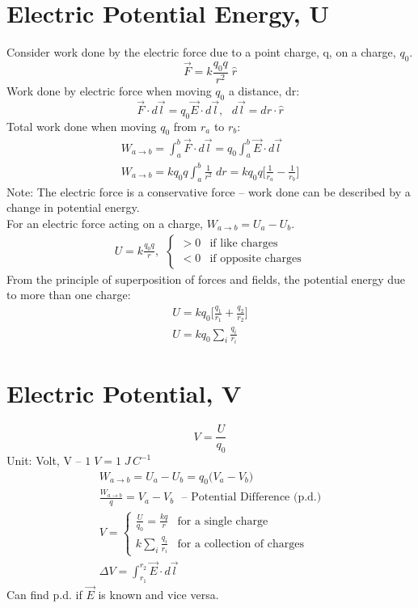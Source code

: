 \documentclass[a4paper, 11pt, fleqn, normalem]{report}
\begin{document}
\section{Electric Potential Energy, U}
Consider work done by the electric force due to a point charge, q, on a charge, $q_{0}$.
\begin{equation*}
    \vec{F} = k \frac{q_{0} q}{r^{2}} \; \hat{r}
\end{equation*}
Work done by electric force when moving $q_{0}$ a distance, dr:
\begin{equation*}
    \vec{F} \cdot d\vec{l} = q_{0}\vec{E} \cdot d\vec{l}, ~~~ d\vec{l} = dr \cdot \hat{r}
\end{equation*}
Total work done when moving $q_{0}$ from $r_{a}$ to $r_{b}$:
\begin{gather*}
    W_{a \to b} = \int_{a}^{b} \vec{F} \cdot d\vec{l} = q_{0} \int_{a}^{b} \vec{E} \cdot d\vec{l} \\
    W_{a \to b} = k q_{0} q \int_{a}^{b} \frac{1}{r^{2}} \; dr = k q_{0} q \Big[\frac{1}{r_{a}} - \frac{1}{r_{b}} \Big]
\end{gather*}
Note: The electric force is a conservative force -- work done can be described by a change in potential energy. \\
For an electric force acting on a charge, $W_{a \to b} = U_{a} - U_{b}$.
\begin{gather*}
    U = k \frac{q_{0} q}{r}, ~~
    \begin{cases}
        > 0 & \text{if like charges} \\
        < 0 & \text{if opposite charges}
    \end{cases}
\end{gather*}
From the principle of superposition of forces and fields, the potential energy due to more than one charge:
\begin{gather*}
    U = kq_{0}\Big[\frac{q_{1}}{r_{1}} + \frac{q_{2}}{r_{2}} \Big]\\
    U = kq_{0} \sum_{i} \frac{q_{i}}{r_{i}}
\end{gather*}

\section{Electric Potential, V}
\begin{equation*}
    V = \frac{U}{q_{0}}
\end{equation*}
Unit: Volt, V -- $1\;V = 1\;J\,C^{-1}$
\begin{gather*}
    W_{a \to b} = U_{a} - U_{b} = q_{0} \big(V_{a} - V_{b}\big) \\
    \frac{W_{a \to b}}{q} = V_{a} - V_{b} ~~~ \text{-- Potential Difference (p.d.)} \\
    V =
    \begin{cases}
        \frac{U}{q_{0}} = \frac{kq}{r} & \text{for a single charge} \\
        k \sum_{i} \frac{q_{i}}{r_{i}} & \text{for a collection of charges}
    \end{cases} \\
    \Delta V = \int_{r_{1}}^{r_{2}} \vec{E} \cdot d\vec{l}
\end{gather*}
Can find p.d. if $\vec{E}$ is known and vice versa.
\end{document}
